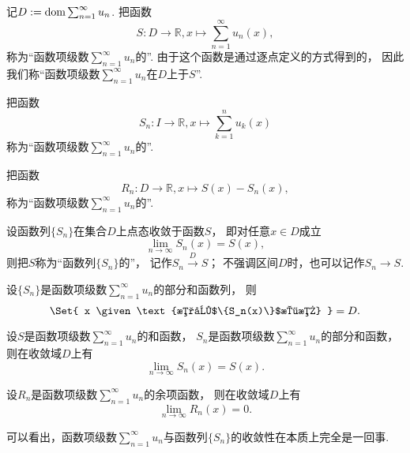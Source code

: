 \begin{definition}
记\(D := \operatorname{dom}\sum_{n=1}^\infty u_n\).
把函数\[
	S\colon D\to\mathbb{R},
	x \mapsto \sum_{n=1}^\infty u_n(x),
\]称为“函数项级数\(\sum_{n=1}^\infty u_n\)的”.
由于这个函数是通过逐点定义的方式得到的，
因此我们称“函数项级数\(\sum_{n=1}^\infty u_n\)在\(D\)上于\(S\)”.

把函数\[
	S_n\colon I\to\mathbb{R},
	x \mapsto \sum_{k=1}^n u_k(x)
\]称为“函数项级数\(\sum_{n=1}^\infty u_n\)的”.

把函数\[
	R_n\colon D\to\mathbb{R},
	x \mapsto S(x) - S_n(x),
\]称为“函数项级数\(\sum_{n=1}^\infty u_n\)的”.
\end{definition}

\begin{definition}
设函数列\(\{S_n\}\)在集合\(D\)上点态收敛于函数\(S\)，
即对任意\(x \in D\)成立\[
	\lim_{n\to\infty} S_n(x) = S(x),
\]
则把\(S\)称为“函数列\(\{S_n\}\)的”，
记作\(S_n \overset{D}\to S\)；
不强调区间\(D\)时，也可以记作\(S_n \to S\).
\end{definition}

\begin{proposition}
设\(\{S_n\}\)是函数项级数\(\sum_{n=1}^\infty u_n\)的部分和函数列，
则\[
	\Set{ x \given \text{数列$\{S_n(x)\}$收敛} } = D.
\]
\end{proposition}
\begin{proposition}
设\(S\)是函数项级数\(\sum_{n=1}^\infty u_n\)的和函数，
\(S_n\)是函数项级数\(\sum_{n=1}^\infty u_n\)的部分和函数，
则在收敛域\(D\)上有\[
	\lim_{n\to\infty} S_n(x) = S(x).
\]
\end{proposition}
\begin{proposition}
设\(R_n\)是函数项级数\(\sum_{n=1}^\infty u_n\)的余项函数，
则在收敛域\(D\)上有\[
	\lim_{n\to\infty} R_n(x) = 0.
\]
\end{proposition}
\begin{remark}
可以看出，函数项级数\(\sum_{n=1}^\infty u_n\)与函数列\(\{S_n\}\)的收敛性在本质上完全是一回事.
\end{remark}


